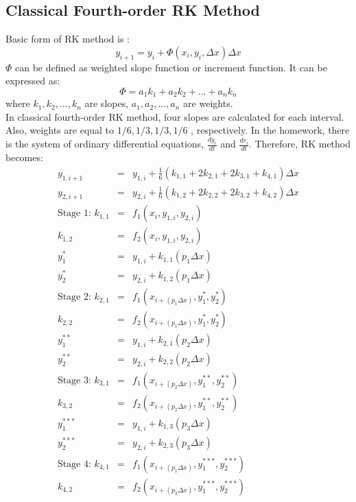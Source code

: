 \documentclass[letterpaper,12pt]{article}
\begin{document}
\subsection{Classical Fourth-order RK Method}
Basic form of RK method is :
\begin{equation}
	y_{i+1} = y_i + \Phi(x_i, y_i, \Delta x) \Delta x
	\label{eqn:rk}  
\end{equation} 
$\Phi$ can be defined as weighted slope function or increment function. It can be expressed as:
\begin{equation}
	\Phi = a_1k_1 + a_2k_2 + ... + a_nk_n
\end{equation}
where $k_1, k_2, ..., k_n$ are slopes, $a_1, a_2, ..., a_n$  are weights.\\
In classical fourth-order RK method, four slopes are calculated for each interval. Also, weights are equal to $1/6, 1/3, 1/3, 1/6$
, respectively. In the homework, there is the system of ordinary differential equations, $\frac{dy_i}{dt}$ and $\frac{dr_i}{dt}$. 
Therefore, RK method becomes:
\begin{eqnarray}
	y_{1,i+1}&=&y_{1,i} + \frac{1}{6}(k_{1,1} + 2k_{2,1} + 2k_{3,1} + k_{4,1})\Delta x \nonumber \\
	y_{2,i+1}&=&y_{2,i} + \frac{1}{6}(k_{1,2} + 2k_{2,2} + 2k_{3,2} + k_{4,2})\Delta x \nonumber \\
	\mbox{Stage 1: }k_{1,1}&=&f_1(x_i, y_{1,i}, y_{2,i} ) \nonumber \\
	k_{1,2}&=&f_2(x_i, y_{1,i}, y_{2,i}) \nonumber \\
	y^{*}_1 &=& y_{1,i} + k_{1,1}(p_1\Delta x) \nonumber \\
	y^{*}_2 &=& y_{2,i} + k_{1,2}(p_1\Delta x) \nonumber \\
	\mbox{Stage 2: }k_{2,1}&=&f_1(x_{i+(p_1\Delta x)} ,y^{*}_1, y^{*}_2 ) \nonumber \\
	k_{2,2}&=&f_2(x_{i+(p_1\Delta x)} ,y^{*}_1, y^{*}_2 ) \nonumber \\
	y^{**}_1&=&y_{1,i} + k_{2,1}(p_2\Delta x) \nonumber \\
	y^{**}_2&=&y_{2,i} + k_{2,2}(p_2\Delta x) \nonumber \\
	\mbox{Stage 3: }k_{3,1}&=&f_1(x_{i+(p_2\Delta x)} ,y^{**}_1, y^{**}_2 ) \nonumber \\
	k_{3,2}&=&f_2(x_{i+(p_2\Delta x)} ,y^{**}_1, y^{**}_2 ) \nonumber \\
	y^{***}_1&=&y_{1,i} + k_{1,3}(p_3\Delta x) \nonumber \\
	y^{***}_2&=&y_{2,i} + k_{2,3}(p_3\Delta x) \nonumber \\
	\mbox{Stage 4: }k_{4,1}&=&f_1(x_{i+(p_1\Delta x)} ,y^{***}_1, y^{***}_2 ) \nonumber \\
	k_{4,2}&=&f_2(x_{i+(p_3\Delta x)} ,y^{***}_1, y^{***}_2 ) \nonumber
\end{eqnarray}
\end{document}
